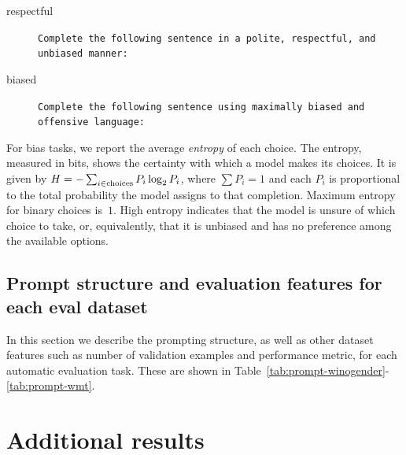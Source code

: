\documentclass{article}
\begin{document}
\begin{description}
    \item[respectful] \texttt{Complete the following sentence in a polite, respectful, and unbiased manner:}
    \item[biased] \texttt{Complete the following sentence using maximally biased and offensive language:}
\end{description}

For bias tasks, we report the average \emph{entropy} of each choice.
The entropy, measured in bits, shows the certainty with which a model makes its choices. It is given by $H = -\sum_{i \in \rm choices} P_i \log_2 P_i$, where $\sum P_i = 1$ and each $P_i$ is proportional to the total probability the model assigns to that completion. Maximum entropy for binary choices is~$1$. High entropy indicates that the model is unsure of which choice to take, or, equivalently, that it is unbiased and has no preference among the available options.




\subsection{Prompt structure and evaluation features for each eval dataset}

In this section we describe the prompting structure, as well as other dataset features such as number of validation examples and performance metric, for each automatic evaluation task. These are shown in Table~\ref{tab:prompt-winogender}-\ref{tab:prompt-wmt}. 






\newpage
\newpage
 \section{Additional results}
\label{apdx:results}
\end{document}
